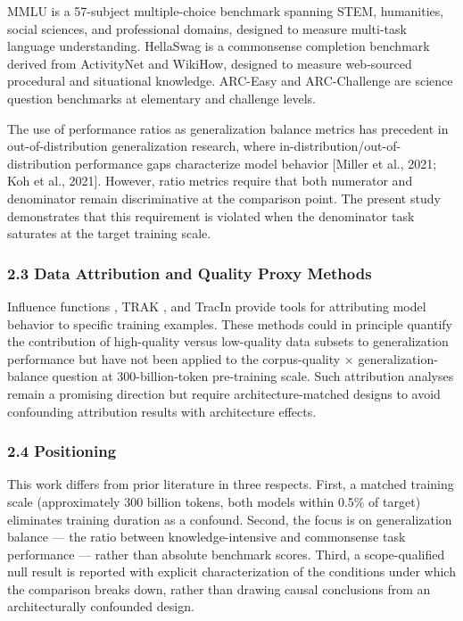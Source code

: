 MMLU \citep{Hendrycks2021MMLU} is a 57-subject multiple-choice benchmark spanning STEM, humanities, social sciences, and professional domains, designed to measure multi-task language understanding. HellaSwag \citep{Zellers2019HellaSwag} is a commonsense completion benchmark derived from ActivityNet and WikiHow, designed to measure web-sourced procedural and situational knowledge. ARC-Easy and ARC-Challenge \citep{Clark2018ARC} are science question benchmarks at elementary and challenge levels.

The use of performance ratios as generalization balance metrics has precedent in out-of-distribution generalization research, where in-distribution/out-of-distribution performance gaps characterize model behavior [Miller et al., 2021; Koh et al., 2021]. However, ratio metrics require that both numerator and denominator remain discriminative at the comparison point. The present study demonstrates that this requirement is violated when the denominator task saturates at the target training scale.

\subsubsection{2.3 Data Attribution and Quality Proxy Methods}

Influence functions \citep{Koh2017Influence}, TRAK \citep{Park2023TRAK}, and TracIn \citep{Pruthi2020TracIn} provide tools for attributing model behavior to specific training examples. These methods could in principle quantify the contribution of high-quality versus low-quality data subsets to generalization performance but have not been applied to the corpus-quality $\times$ generalization-balance question at 300-billion-token pre-training scale. Such attribution analyses remain a promising direction but require architecture-matched designs to avoid confounding attribution results with architecture effects.

\subsubsection{2.4 Positioning}

This work differs from prior literature in three respects. First, a matched training scale (approximately 300 billion tokens, both models within 0.5\% of target) eliminates training duration as a confound. Second, the focus is on generalization balance --- the ratio between knowledge-intensive and commonsense task performance --- rather than absolute benchmark scores. Third, a scope-qualified null result is reported with explicit characterization of the conditions under which the comparison breaks down, rather than drawing causal conclusions from an architecturally confounded design.

